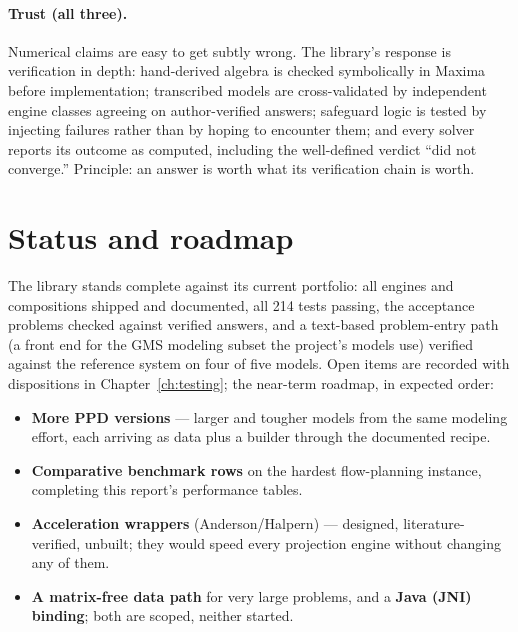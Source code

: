 \paragraph{Trust (all three).} Numerical claims are easy to get subtly
wrong. The library's response is verification in depth: hand-derived
algebra is checked symbolically in Maxima before implementation;
transcribed models are cross-validated by independent engine classes
agreeing on author-verified answers; safeguard logic is tested by
injecting failures rather than by hoping to encounter them; and every
solver reports its outcome as computed, including the well-defined
verdict ``did not converge.'' Principle: an answer is worth what its
verification chain is worth.

\section{Status and roadmap}
\label{sec:o-status}

The library stands complete against its current portfolio: all engines
and compositions shipped and documented, all 214 tests passing, the
acceptance problems checked against verified answers, and a text-based
problem-entry path (a front end for the GMS modeling subset the
project's models use) verified against the reference system on four of
five models. Open items are
recorded with dispositions in Chapter~\ref{ch:testing}; the near-term
roadmap, in expected order:

\begin{itemize}
\item \textbf{More PPD versions} --- larger and tougher models from the
  same modeling effort, each arriving as data plus a builder through the
  documented recipe.
\item \textbf{Comparative benchmark rows} on the hardest flow-planning
  instance, completing this report's performance tables.
\item \textbf{Acceleration wrappers} (Anderson/Halpern) --- designed,
  literature-verified, unbuilt; they would speed every projection engine
  without changing any of them.
\item \textbf{A matrix-free data path} for very large problems, and a
  \textbf{Java (JNI) binding}; both are scoped, neither started.
\end{itemize}
